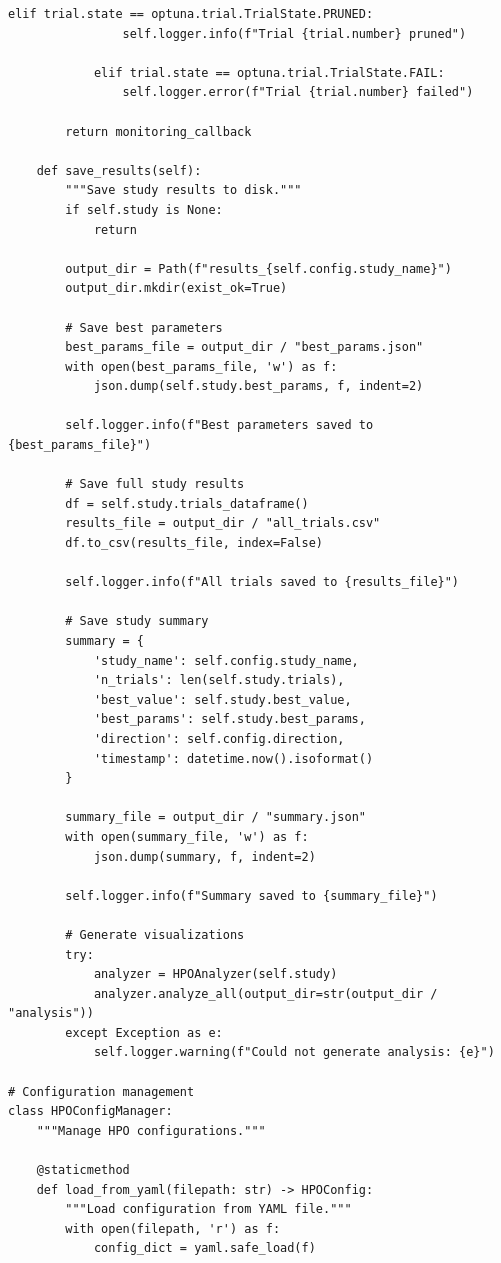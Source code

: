 \begin{lstlisting}[style=python, caption=Production-grade automated HPO pipeline]
            elif trial.state == optuna.trial.TrialState.PRUNED:
                self.logger.info(f"Trial {trial.number} pruned")

            elif trial.state == optuna.trial.TrialState.FAIL:
                self.logger.error(f"Trial {trial.number} failed")

        return monitoring_callback

    def save_results(self):
        """Save study results to disk."""
        if self.study is None:
            return

        output_dir = Path(f"results_{self.config.study_name}")
        output_dir.mkdir(exist_ok=True)

        # Save best parameters
        best_params_file = output_dir / "best_params.json"
        with open(best_params_file, 'w') as f:
            json.dump(self.study.best_params, f, indent=2)

        self.logger.info(f"Best parameters saved to {best_params_file}")

        # Save full study results
        df = self.study.trials_dataframe()
        results_file = output_dir / "all_trials.csv"
        df.to_csv(results_file, index=False)

        self.logger.info(f"All trials saved to {results_file}")

        # Save study summary
        summary = {
            'study_name': self.config.study_name,
            'n_trials': len(self.study.trials),
            'best_value': self.study.best_value,
            'best_params': self.study.best_params,
            'direction': self.config.direction,
            'timestamp': datetime.now().isoformat()
        }

        summary_file = output_dir / "summary.json"
        with open(summary_file, 'w') as f:
            json.dump(summary, f, indent=2)

        self.logger.info(f"Summary saved to {summary_file}")

        # Generate visualizations
        try:
            analyzer = HPOAnalyzer(self.study)
            analyzer.analyze_all(output_dir=str(output_dir / "analysis"))
        except Exception as e:
            self.logger.warning(f"Could not generate analysis: {e}")

# Configuration management
class HPOConfigManager:
    """Manage HPO configurations."""

    @staticmethod
    def load_from_yaml(filepath: str) -> HPOConfig:
        """Load configuration from YAML file."""
        with open(filepath, 'r') as f:
            config_dict = yaml.safe_load(f)


\end{lstlisting}
